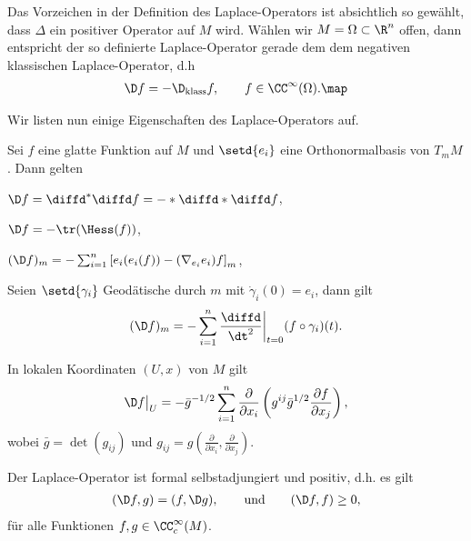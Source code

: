 \documentclass[%
	paper=a5,%
	fleqn,%
	DIV=18,%
	BCOR=0mm,
	fontsize=11pt,
	titlepage=false,%
	bibliography=totoc,
	DIV=18,%
	twoside=true,
	pdftitle=Riemannsche Geometrie,
	pdfauthor=Uwe Semmelmann,
	numbers=noendperiod]%
	{scrbook}
\begin{document}
\begin{rem}
Das Vorzeichen in der Definition des Laplace-Operators ist absichtlich so gewählt, dass $\Delta$ ein positiver Operator auf $M$ wird. Wählen wir $M=\Omega\subset \R^n$ offen, dann entspricht der so definierte Laplace-Operator gerade dem dem negativen klassischen Laplace-Operator, d.h
\begin{align*}
\D f = -\D_{\text{klass}}f,\qquad f\in\CC^\infty(\Omega).\map
\end{align*}
\end{rem}

Wir listen nun einige Eigenschaften des Laplace-Operators auf.

\begin{prop}
Sei $f$ eine glatte Funktion auf $M$ und $\setd{e_{i}}$ eine Orthonormalbasis von $T_{m}M$. Dann gelten
\begin{propenum}
\item $\D f = \diffd^*\diffd f = -*\diffd*\diffd f$,
\item $\D f = -\tr(\Hess(f))$,
\item $(\D f)_{m} = -\sum_{i=1}^n \left[ e_{i}(e_{i}(f)) - (\nabla_{e_{i}}e_{i})f\right]_{m}$,
\item Seien $\setd{\gamma_{i}}$ Geodätische durch $m$ mit $\dot{\gamma}_{i}(0) = e_{i}$, dann gilt
\begin{align*}
(\D f)_{m} = -\sum_{i=1}^n \frac{\diffd}{\dt^2}\bigg|_{t=0} (f\circ\gamma_{i})(t).
\end{align*}
\item In lokalen Koordinaten $(U,x)$ von $M$ gilt
\begin{align*}
\D f\big|_{U} = - \bar{g}^{-1/2} \sum_{i=1}^n \frac{\partial}{\partial x_{i}} \left( g^{ij} \bar{g}^{1/2} \frac{\partial f}{\partial x_{j}}\right),
\end{align*}
wobei $\bar{g} = \det(g_{ij})$ und $g_{ij} = g\left( \frac{\partial}{\partial x_{i}},\frac{\partial}{\partial x_{j}}\right)$.
\item Der Laplace-Operator ist formal selbstadjungiert und positiv, d.h. es gilt
\begin{align*}
(\D f,g) = (f,\D g),\qquad \text{und}\qquad (\D f,f) \ge 0,
\end{align*}
für alle Funktionen $f,g\in\CC_{c}^\infty(M)$.\fish
\end{propenum}
\end{prop}
\end{document}

